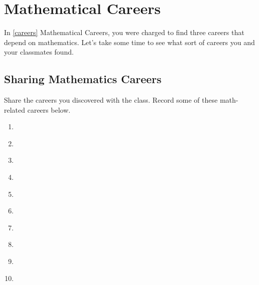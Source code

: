 
\section{Mathematical Careers}\label{careers class}


In \ref{careers} Mathematical Careers, you were charged to find three careers that depend on mathematics. Let's take some time to see what sort of careers you and your classmates found.

\subsection{Sharing Mathematics Careers} 

\begin{exercise}
Share the careers you discovered with the class. Record some of these math-related careers below.
\end{exercise}

\begin{enumerate}
    \item \hspace{1.5in} \\
    \item \hspace{1.5in}  \\
    \item \hspace{1.5in} \\ 
    \item \hspace{1.5in} \\ 
    \item \hspace{1.5in} \\ 
    \item \hspace{1.5in} \\ 
    \item \hspace{1.5in} \\ 
    \item \hspace{1.5in} \\ 
    \item \hspace{1.5in} \\ 
    \item \hspace{1.5in} 
\end{enumerate}

